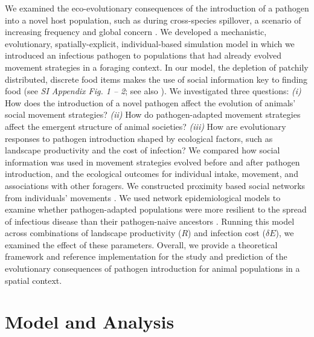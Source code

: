 We examined the eco-evolutionary consequences of the introduction of a pathogen into a novel host population, such as during cross-species spillover, a scenario of increasing frequency and global concern \citep{blehert2009,globconsorth5n82016,fereidouni2019,scheele2019,sanderson2020,carlson2021,kuchipudi2022}.
We developed a mechanistic, evolutionary, spatially-explicit, individual-based simulation model in which we introduced an infectious pathogen to populations that had already evolved movement strategies in a foraging context.
In our model, the depletion of patchily distributed, discrete food items makes the use of social information key to finding food (see \textit{SI Appendix Fig. 1 -- 2}; see also \citealt{gupte2021a}).
We investigated three questions: \textit{(i)} How does the introduction of a novel pathogen affect the evolution of animals' social movement strategies?
\textit{(ii)} How do pathogen-adapted movement strategies affect the emergent structure of animal societies?
\textit{(iii)} How are evolutionary responses to pathogen introduction shaped by ecological factors, such as landscape productivity and the cost of infection?
We compared how social information was used in movement strategies evolved before and after pathogen introduction, and the ecological outcomes for individual intake, movement, and associations with other foragers.
We constructed proximity based social networks from individuals' movements \citep{whitehead2008,farine2015}.
We used network epidemiological models to examine whether pathogen-adapted populations were more resilient to the spread of infectious disease than their pathogen-naive ancestors \citep[][]{stroeymeyt2018}.
Running this model across combinations of landscape productivity ($R$) and infection cost ($\delta E$), we examined the effect of these parameters.
Overall, we provide a theoretical framework and reference implementation for the study and prediction of the evolutionary consequences of pathogen introduction for animal populations in a spatial context.

\section*{Model and Analysis}


